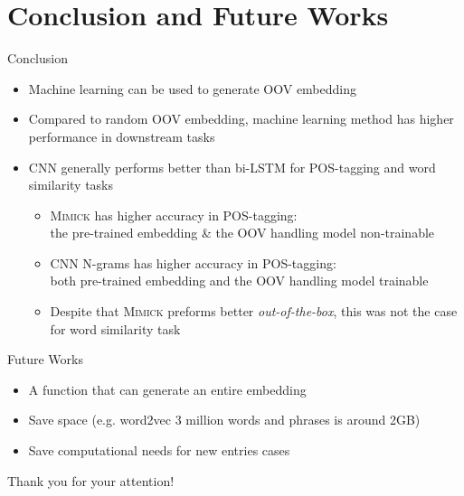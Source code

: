 \documentclass{beamer}
\begin{document}
\section{Conclusion and Future Works}
\begin{frame}{Conclusion}
    \begin{itemize}
        \item Machine learning can be
        used to generate OOV embedding
        \item Compared to random OOV embedding, machine learning
        method has higher performance in downstream tasks
        \item CNN generally performs better than bi-LSTM for POS-tagging and word
        similarity tasks
        \begin{itemize}
            \item \textsc{Mimick} has higher accuracy in
            POS-tagging:\\
            the pre-trained embedding \& the OOV handling model non-trainable
            \item CNN N-grams has higher accuracy in POS-tagging:\\
            both pre-trained embedding and the OOV handling model trainable
            \item Despite that \textsc{Mimick} preforms better
            \textit{out-of-the-box}, this was not the case for word
            similarity task
        \end{itemize}
    \end{itemize}
\end{frame}

\begin{frame}{Future Works}
    \begin{itemize}
        \item A function that can generate an entire embedding
        \item Save space (e.g. word2vec 3 million words and phrases is
        around 2GB)
        \item Save computational needs for new entries cases
    \end{itemize}
\end{frame}

\begin{frame}
    \Huge{\centerline{Thank you for your attention!}}
\end{frame}
    


\end{document}
